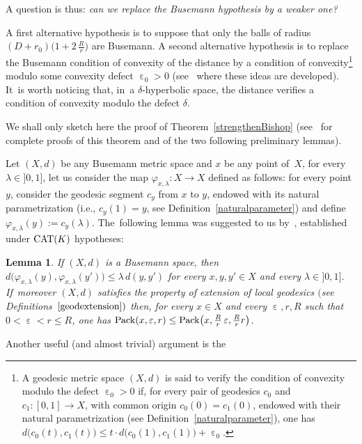 \documentclass[10pt,a4paper]{amsart}
\numberwithin{equation}{section}
\newtheorem{Lemma}[theor]{Lemma}
\newcommand{\f}{\rightarrow}
\newcommand{\e}{\operatorname{\varepsilon}}
\begin{document}
\medskip

A question is thus: \textit{can we replace the Busemann hypothesis by a weaker one?}

\medskip

A first alternative hypothesis is to suppose that only the balls of radius $(D+ r_0) \big(1 +2\,\frac{R}{r}\big)$ are Busemann.
A second alternative hypothesis is to replace the Busemann condition of convexity of the distance by a condition of convexity\footnote{A geodesic metric space $(X, d)$ is said to verify the condition of convexity modulo
the defect $\e_0 > 0$ if,
for every pair of geodesics $c_0$ and $c_1\colon [0, 1] \f X $, with common origin $c_0 (0) = c_1 (0)$, endowed with their natural parametrization (see Definition~\ref{naturalparameter}),
one has $ d \big(c_0(t), c_1 (t) \big) \le t\cdot d \big(c_0 (1), c_1 (1) \big) + \e_0$.} modulo some convexity defect $\e_0 > 0$ (see~\cite{BCGS2} where these ideas are developed). It~is worth noticing that, in~a $\delta$-hyperbolic space, the distance verifies a condition of convexity modulo the defect $\delta$.


We shall only sketch here the proof of Theorem~\ref{strengthenBishop} (see~\cite{BCGS2} for complete proofs of this theorem and of the two following
preliminary lemmas).

Let $(X, d) $ be any Busemann metric space and $x$ be any point of~$X$, for every $\lambda \in{} ] 0, 1]$, let us consider the map
$\varphi_{x, \lambda}\colon X \f X$ defined as follows: for every point $y $,
consider the geodesic segment $c_y$ from $x$ to $y$, endowed with its natural parametrization (i.e., $c_y (1) = y$, see Defi\-nition~\ref{naturalparameter}) and define $\varphi_{x, \lambda} (y) := c_y \left( \lambda\right)$. The~following lemma was suggested to us by~\cite[Lemma~4.5]{CS4}, established under ${\rm CAT}(K)$ hypotheses:

\begin{Lemma}\label{contractionbis} If $(X, d) $ is a Busemann space, then $d\big( \varphi_{x, \lambda} (y), \varphi_{x, \lambda} (y')\big) \le
\lambda \, d (y,y')$ for every $x, y, y' \in X$ and every
$\lambda \in{} ] 0, 1]$. If~moreover $(X, d) $ satisfies the property of extension of local geodesics $($see Definitions~$\ref{geodextension})$ then, for every $x \in X$ and every
$ \e, r, R$ such that $ 0 < \e < r \le R$, one has $ {\rm Pack} (x, \e, r) \le {\rm Pack} \big(x, \frac{R}{r} \e,\frac{R}{r} r\big)$.
\end{Lemma}

Another useful (and almost trivial) argument is the
\end{document}
